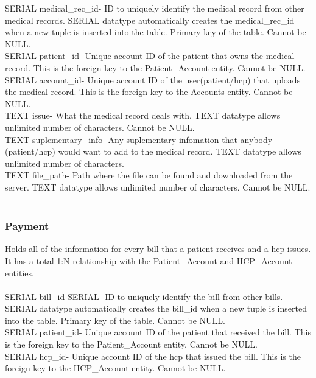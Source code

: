 \documentclass[12pt]{report}
\begin{document}
SERIAL medical\_rec\_id- ID to uniquely identify the medical record from other medical records. SERIAL datatype automatically creates the medical\_rec\_id when a new tuple is inserted into the table.  Primary key of the table.  Cannot be NULL.\\

SERIAL patient\_id- Unique account ID of the patient that owns the medical record.  This is the foreign key to the Patient\_Account entity.  Cannot be NULL.\\

SERIAL account\_id- Unique account ID of the user(patient/hcp) that uploads the medical record.  This is the foreign key to the Accounts entity.  Cannot be NULL.\\

TEXT issue-  What the medical record deals with.  TEXT datatype allows unlimited number of characters.  Cannot be NULL.\\

TEXT suplementary\_info- Any suplementary infomation that anybody (patient/hcp) would want to add to the medical record.  TEXT datatype allows unlimited number of characters.\\

TEXT file\_path- Path where the file can be found and downloaded from the server.  TEXT datatype allows unlimited number of characters.  Cannot be NULL.\\ \\

\subsubsection{Payment}
Holds all of the information for every bill that a patient receives and a hcp issues.  It has a total 1:N relationship with the Patient\_Account and HCP\_Account entities.\\ \\

SERIAL bill\_id SERIAL-  ID to uniquely identify the bill from other bills. SERIAL datatype automatically creates the bill\_id when a new tuple is inserted into the table.  Primary key of the table.  Cannot be NULL.\\

SERIAL patient\_id- Unique account ID of the patient that received the bill.  This is the foreign key to the Patient\_Account entity.  Cannot be NULL.\\

SERIAL hcp\_id- Unique account ID of the hcp that issued the bill.  This is the foreign key to the HCP\_Account entity.  Cannot be NULL.\\
\end{document}
